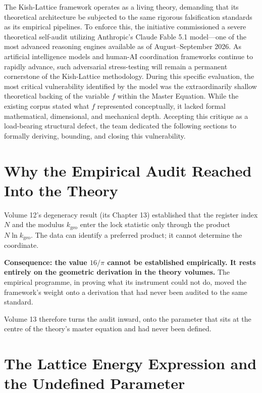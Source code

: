 \documentclass[11pt, letterpaper, openany]{book}
\newcommand{\kgeo}{k_{\mathrm{geo}}}
\begin{document}
The Kish-Lattice framework operates as a living theory, demanding that its theoretical architecture be subjected to the same rigorous falsification standards as its empirical pipelines. To enforce this, the initiative commissioned a severe theoretical self-audit utilizing Anthropic's Claude Fable 5.1 model—one of the most advanced reasoning engines available as of August--September 2026. As artificial intelligence models and human-AI coordination frameworks continue to rapidly advance, such adversarial stress-testing will remain a permanent cornerstone of the Kish-Lattice methodology. During this specific evaluation, the most critical vulnerability identified by the model was the extraordinarily shallow theoretical backing of the variable $f$ within the Master Equation. While the existing corpus stated what $f$ represented conceptually, it lacked formal mathematical, dimensional, and mechanical depth. Accepting this critique as a load-bearing structural defect, the team dedicated the following sections to formally deriving, bounding, and closing this vulnerability.

\section{Why the Empirical Audit Reached Into the Theory}

Volume 12's degeneracy result (its Chapter 13) established that the register index $N$ and the
modulus $\kgeo$ enter the lock statistic only through the product $N \ln \kgeo$. The data can
identify a preferred product; it cannot determine the coordinate.

\begin{signalbox}
\textbf{Consequence: the value $16/\pi$ cannot be established empirically. It rests entirely on
the geometric derivation in the theory volumes.} The empirical programme, in proving what its
instrument could not do, moved the framework's weight onto a derivation that had never been
audited to the same standard.
\end{signalbox}

Volume 13 therefore turns the audit inward, onto the parameter that sits at the centre of the
theory's master equation and had never been defined.

\section{The Lattice Energy Expression and the Undefined Parameter}
\end{document}

